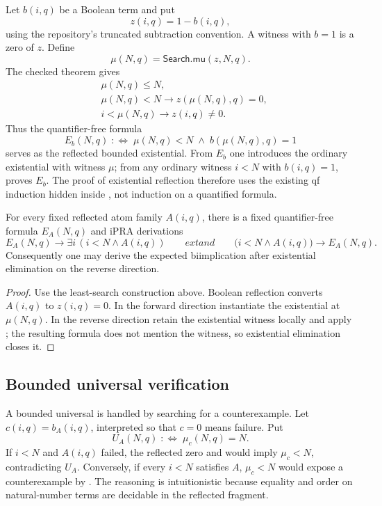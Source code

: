 Let \(b(i,q)\) be a Boolean term and put
\[
  z(i,q)=1-b(i,q),
\]
using the repository's truncated subtraction convention.  A witness with
\(b=1\) is a zero of \(z\).  Define
\[
   \mu(N,q)=\mathsf{Search.mu}(z,N,q).
\]
The checked theorem  gives
\[
\begin{aligned}
  &\mu(N,q)\le N,\\
  &\mu(N,q)<N\to z(\mu(N,q),q)=0,\\
  &i<\mu(N,q)\to z(i,q)\ne 0.
\end{aligned}
\]
Thus the quantifier-free formula
\[
   E_b(N,q)\;:\!\Longleftrightarrow\;
   \mu(N,q)<N\;\wedge\;b(\mu(N,q),q)=1
\]
serves as the reflected bounded existential.  From \(E_b\) one introduces the
ordinary existential with witness \(\mu\); from any ordinary witness
\(i<N\) with \(b(i,q)=1\),  proves \(E_b\).  The proof of
existential reflection therefore uses the existing qf induction hidden inside
, not induction on a quantified formula.

\begin{theorem}
For every fixed reflected atom family \(A(i,q)\), there is a fixed
quantifier-free formula \(E_A(N,q)\) and iPRA derivations
\[
  E_A(N,q)\to\exists i\,(i<N\wedge A(i,q))
  \qquad	ext{and}\qquad
  \bigl(i<N\wedge A(i,q)\bigr)\to E_A(N,q).
\]
Consequently one may derive the expected biimplication after existential
elimination on the reverse direction.
\end{theorem}

\begin{proof}
Use the least-search construction above.  Boolean reflection converts
\(A(i,q)\) to \(z(i,q)=0\).  In the forward direction instantiate the
existential at \(\mu(N,q)\).  In the reverse direction retain the existential
witness locally and apply ; the resulting formula does not
mention the witness, so existential elimination closes it.
\end{proof}

\subsection{Bounded universal verification}

A bounded universal is handled by searching for a counterexample.  Let
\(c(i,q)=b_A(i,q)\), interpreted so that \(c=0\) means failure.  Put
\[
  U_A(N,q)\;:\!\Longleftrightarrow\;\mu_c(N,q)=N.
\]
If \(i<N\) and \(A(i,q)\) failed, the reflected zero and
 would imply \(\mu_c<N\), contradicting \(U_A\).  Conversely,
if every \(i<N\) satisfies \(A\), \(\mu_c<N\) would expose a counterexample by
.  The reasoning is intuitionistic because equality and
order on natural-number terms are decidable in the reflected fragment.

